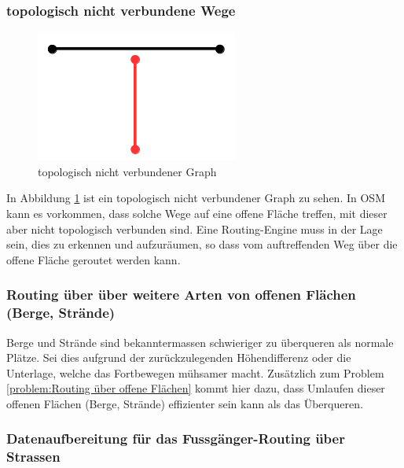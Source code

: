 \subsubsection{topologisch nicht verbundene Wege}
\label{problem:topologisch nicht verbundene Wege}

\begin{figure}[ht]
\centering
\includegraphics[width=0.5\linewidth]{technicalreport/img/topologisch_nicht_verbundener_graph}
\caption[topologisch nicht verbundener Graph]{topologisch nicht verbundener Graph}
\label{fig:topologisch_nicht_verbundener_graph}
\end{figure}

In Abbildung \ref{fig:topologisch_nicht_verbundener_graph} ist ein topologisch nicht verbundener Graph zu sehen. In \ac{OSM} kann es vorkommen, dass solche Wege auf eine offene Fläche treffen, mit dieser aber nicht topologisch verbunden sind. Eine Routing-Engine muss in der Lage sein, dies zu erkennen und aufzuräumen, so dass vom auftreffenden Weg über die offene Fläche geroutet werden kann.

\subsubsection{Routing über über weitere Arten von offenen Flächen (Berge, Strände)}
\label{problem:Routing über über weitere Arten von offenen Flächen (Berge, Strände)}
Berge und Strände sind bekanntermassen schwieriger zu überqueren als normale Plätze. Sei dies aufgrund der zurückzulegenden Höhendifferenz oder die Unterlage, welche das Fortbewegen mühsamer macht. Zusätzlich zum Problem \ref{problem:Routing über offene Flächen} kommt hier dazu, dass Umlaufen dieser offenen Flächen (Berge, Strände) effizienter sein kann als das Überqueren.

\subsubsection{Datenaufbereitung für das Fussgänger-Routing über Strassen}
\label{problem:Datenaufbereitung für das Fussgänger-Routing über Strassen}

